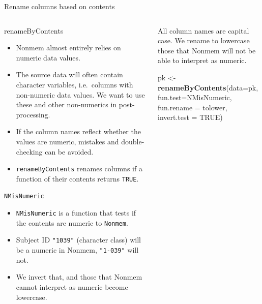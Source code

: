 \documentclass[
  8pt,
  ignorenonframetext,
  aspectratio=169]{beamer}
\newenvironment{Shaded}{\begin{snugshade}}{\end{snugshade}}
\newcommand{\DataTypeTok}[1]{\textcolor[rgb]{0.13,0.29,0.53}{#1}}
\newcommand{\KeywordTok}[1]{\textcolor[rgb]{0.13,0.29,0.53}{\textbf{#1}}}
\newcommand{\NormalTok}[1]{#1}
\newcommand{\OtherTok}[1]{\textcolor[rgb]{0.56,0.35,0.01}{#1}}
\newcommand{\StringTok}[1]{\textcolor[rgb]{0.31,0.60,0.02}{#1}}
\providecommand{\tightlist}{%
  \setlength{\itemsep}{0pt}\setlength{\parskip}{0pt}}
\begin{document}
\begin{frame}[fragile]{Rename columns based on contents}
\protect\hypertarget{rename-columns-based-on-contents}{}
\begin{columns}[T]
\begin{column}{0.48\textwidth}
\begin{block}{renameByContents}
\protect\hypertarget{renamebycontents}{}
\begin{itemize}
\tightlist
\item
  Nonmem almost entirely relies on numeric data values.
\item
  The source data will often contain character variables, i.e.~columns
  with non-numeric data values. We want to use these and other
  non-numerics in post-processing.
\item
  If the column names reflect whether the values are numeric, mistakes
  and double-checking can be avoided.
\item
  \texttt{renameByContents} renames columns if a function of their
  contents returns \texttt{TRUE}.
\end{itemize}
\end{block}

\begin{block}{\texttt{NMisNumeric}}
\protect\hypertarget{nmisnumeric}{}
\begin{itemize}
\tightlist
\item
  \texttt{NMisNumeric} is a function that tests if the contents are
  numeric to \texttt{Nonmem}.
\item
  Subject ID \texttt{"1039"} (character class) will be a numeric in
  Nonmem, \texttt{"1-039"} will not.
\item
  We invert that, and those that Nonmem cannot interpret as numeric
  become lowercase.
\end{itemize}
\end{block}
\end{column}

\begin{column}{0.48\textwidth}
All column names are capital case. We rename to lowercase those that
Nonmem will not be able to interpret as numeric. \footnotesize

\begin{Shaded}
\begin{Highlighting}[]
\NormalTok{pk \textless{}{-}}\StringTok{ }\KeywordTok{renameByContents}\NormalTok{(}\DataTypeTok{data=}\NormalTok{pk,}
                       \DataTypeTok{fun.test=}\NormalTok{NMisNumeric,}
                       \DataTypeTok{fun.rename =}\NormalTok{ tolower,}
                       \DataTypeTok{invert.test =} \OtherTok{TRUE}\NormalTok{)}
\end{Highlighting}
\end{Shaded}


\end{column}
\end{columns}
\end{frame}
\end{document}
